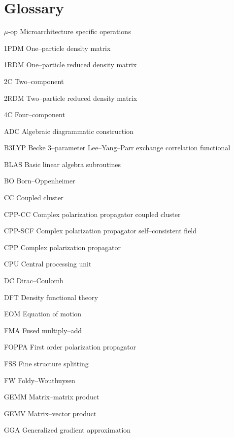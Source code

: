 \chapter*{Glossary}      %
\thispagestyle{plain}
%
\begin{glossary}
  \item[$\mu$-op]    Microarchitecture specific operations
  \item[1PDM]        One--particle density matrix
  \item[1RDM]        One--particle reduced density matrix
  \item[2C]          Two--component
  \item[2RDM]        Two--particle reduced density matrix
  \item[4C]          Four--component
  \item[ADC]         Algebraic diagrammatic construction
  \item[B3LYP]       Becke 3--parameter Lee--Yang--Parr exchange correlation functional
  \item[BLAS]        Basic linear algebra subroutines
  \item[BO]          Born--Oppenheimer
  \item[CC]          Coupled cluster
  \item[CPP-CC]      Complex polarization propagator coupled cluster
  \item[CPP-SCF]     Complex polarization propagator self--consistent field
  \item[CPP]         Complex polarization propagator
  \item[CPU]         Central processing unit
  \item[DC]          Dirac--Coulomb
  \item[DFT]         Density functional theory
  \item[EOM]         Equation of motion
  \item[FMA]         Fused multiply--add
  \item[FOPPA]       First order polarization propagator
  \item[FSS]         Fine structure splitting
  \item[FW]          Foldy--Wouthuysen
  \item[GEMM]        Matrix--matrix product
  \item[GEMV]        Matrix--vector product
  \item[GGA]         Generalized gradient approximation

\end{glossary}
